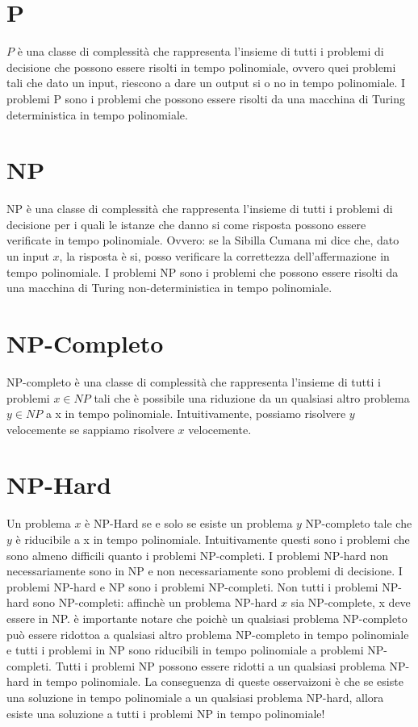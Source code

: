 \documentclass[12pt, a4paper, openany]{book}
\begin{document}
	\section{P}
$P$ è una classe di complessità che rappresenta l'insieme di tutti i problemi di decisione che possono essere risolti in tempo polinomiale, ovvero quei problemi tali che dato un input, riescono a dare un output si o no in tempo polinomiale.
	I problemi P sono i problemi che possono essere risolti da una macchina di Turing deterministica in tempo polinomiale.
	\section{NP}
	NP è una classe di complessità che rappresenta l'insieme di tutti i problemi di decisione per i quali le istanze che danno si come risposta possono essere verificate in tempo polinomiale.
	Ovvero: se la Sibilla Cumana mi dice che, dato un input $x$, la risposta è si, posso verificare la correttezza dell'affermazione in tempo polinomiale.
	I problemi NP sono i problemi che possono essere risolti da una macchina di Turing non-deterministica in tempo polinomiale.
	\section{NP-Completo}
	NP-completo è una classe di complessità che rappresenta l'insieme di tutti i problemi $x\in NP$ tali che è possibile una riduzione da un qualsiasi altro problema $y \in NP$ a x in tempo polinomiale.
	Intuitivamente, possiamo risolvere $y$ velocemente se sappiamo risolvere $x$ velocemente.
	\section{NP-Hard}
	Un problema $x$ è NP-Hard se e solo se esiste un problema $y$ NP-completo tale che $y$ è riducibile a x in tempo polinomiale.
	Intuitivamente questi sono i problemi che sono almeno difficili quanto i problemi NP-completi.
	I problemi NP-hard non necessariamente sono in NP e non necessariamente sono problemi di decisione.
	I problemi NP-hard e NP sono i problemi NP-completi.
	Non tutti i problemi NP-hard sono NP-completi: affinchè un problema NP-hard $x$ sia NP-complete, x deve essere in NP.
è importante notare che poichè un qualsiasi problema NP-completo può essere ridottoa a qualsiasi altro problema NP-completo in tempo polinomiale e tutti i problemi in NP sono riducibili in tempo polinomiale a problemi NP-completi.
Tutti i problemi NP possono essere ridotti a un qualsiasi problema NP-hard in tempo polinomiale.
La conseguenza di queste osservaizoni è che se esiste una soluzione in tempo polinomiale a un qualsiasi problema NP-hard, allora esiste una soluzione a tutti i problemi NP in tempo polinomiale!
\end{document}
